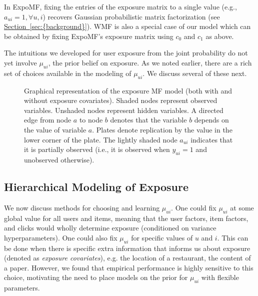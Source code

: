 \documentclass{sig-alternate-arxiv}
\begin{document}
In ExpoMF, fixing the entries of the exposure matrix to a single value
(e.g., $a_{ui}=1, \forall u, i$) recovers Gaussian probabilistic matrix
factorization \cite{mnih2007probabilistic} (see {\hyperref[sec:{background}]{Section~\ref*{sec:{background}}}}). WMF is also a special case of
our model which can be obtained by fixing ExpoMF's exposure matrix using
$c_0$ and $c_1$ as above.

The intuitions we developed for 
user exposure from the joint probability 
do not yet involve $\mu_{ui}$, 
the prior belief on exposure. 
As we noted earlier, 
there are a rich set of choices 
available in the modeling of $\mu_{ui}$. 
We discuss several of these next.

\begin{figure}[!tbp]
  \centering
  \caption{Graphical representation of the exposure MF model (both with and without exposure covariates). 
  Shaded nodes represent observed variables.
Unshaded nodes represent hidden variables. A directed
edge from node $a$ to node $b$ denotes that the variable $b$ depends
on the value of variable $a$. Plates denote replication 
by the value in the lower corner of the plate. The lightly shaded node $a_{ui}$ indicates that it is partially observed (i.e., it is observed when $y_{ui} = 1$ and unobserved otherwise).}
\end{figure}

\subsection{Hierarchical Modeling of Exposure}
\label{sec:modeling_mu}

We now discuss methods for choosing and learning $\mu_{ui}$. 
One could fix $\mu_{ui}$ 
at some global value for all users and items, 
meaning that the user factors, item factors, and clicks 
would wholly determine exposure (conditioned on variance hyperparameters). 
One could also fix $\mu_{ui}$ for specific values of $u$ and $i$. 
This can be done when there is specific extra information 
that informs us about exposure (denoted as \emph{exposure covariates}), e.g. the location of a restaurant, the content of a paper. 
However, we found that empirical performance is highly sensitive to this choice, 
motivating the need to place models on the prior for $\mu_{ui}$ 
with flexible parameters. 
\end{document}
